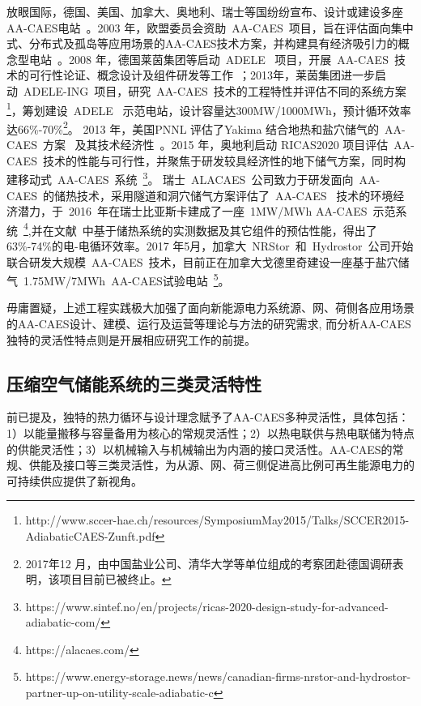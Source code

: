 放眼国际，德国、美国、加拿大、奥地利、瑞士等国纷纷宣布、设计或建设多座AA-CAES电站~\cite{CAES-Review-16-Polygeneration,CAES-Review-09,CAES-Review-16-Rui,CAES-Review-18-Rui-operation}。2003 年，欧盟委员会资助~AA-CAES~项目，旨在评估面向集中式、分布式及孤岛等应用场景的AA-CAES技术方案，并构建具有经济吸引力的概念型电站~\cite{AA-CAES-04}。2008 年，德国莱茵集团等启动~ADELE~ 项目，开展~AA-CAES~技术的可行性论证、概念设计及组件研发等工作~\cite{AA-CAES-07}；2013年，莱茵集团进一步启动~ADELE-ING~项目，研究~AA-CAES~技术的工程特性并评估不同的系统方案\footnote{http://www.sccer-hae.ch/resources/SymposiumMay2015/Talks/SCCER2015-AdiabaticCAES-Zunft.pdf}，筹划建设~ADELE~ 示范电站，设计容量达300MW/1000MWh，预计循环效率达66\%-70\%\footnote{2017年12 月，由中国盐业公司、清华大学等单位组成的考察团赴德国调研表明，该项目目前已被终止。}\cite{CAES-Review-18-Rui-operation}。 2013 年，美国PNNL 评估了Yakima 结合地热和盐穴储气的~AA-CAES~方案~\cite{AA-CAES-Patent-12} 及其技术经济性~\cite{CAES-PNNL-13}。2015 年，奥地利启动 RICAS2020 项目评估~AA-CAES~技术的性能与可行性，并聚焦于研发较具经济性的地下储气方案，同时构建移动式~AA-CAES~系统~\footnote{https://www.sintef.no/en/projects/ricas-2020-design-study-for-advanced-adiabatic-com/}\cite{CAES-Review-18-Rui-operation}。 瑞士~ALACAES~公司致力于研发面向~AA-CAES~的储热技术，采用隧道和洞穴储气方案评估了~AA-CAES~ 技术的环境经济潜力，于~2016~年在瑞士比亚斯卡建成了一座~1MW/MWh AA-CAES~示范系统~\footnote{https://alacaes.com/}\cite{CAES-Review-18-Rui-operation},并在文献~中基于储热系统的实测数据及其它组件的预估性能，得出了63\%-74\%的电-电循环效率。2017 年5月，加拿大~NRStor~和~Hydrostor~公司开始联合研发大规模~AA-CAES~技术，目前正在加拿大戈德里奇建设一座基于盐穴储气~1.75MW/7MWh~AA-CAES试验电站~\footnote{https://www.energy-storage.news/news/canadian-firms-nrstor-and-hydrostor-partner-up-on-utility-scale-adiabatic-c}\cite{CAES-Review-18-Rui-operation}。

毋庸置疑，上述工程实践极大加强了面向新能源电力系统源、网、荷侧各应用场景的AA-CAES设计、建模、运行及运营等理论与方法的研究需求, 而分析AA-CAES独特的灵活性特点则是开展相应研究工作的前提。


\subsection{压缩空气储能系统的三类灵活特性}
\label{sec:flexibility-intro}
前已提及，独特的热力循环与设计理念赋予了AA-CAES多种灵活性，具体包括：1）以能量搬移与容量备用为核心的常规灵活性；2）以热电联供与热电联储为特点的供能灵活性；3）以机械输入与机械输出为内涵的接口灵活性。AA-CAES的常规、供能及接口等三类灵活性，为从源、网、荷三侧促进高比例可再生能源电力的可持续供应提供了新视角。

